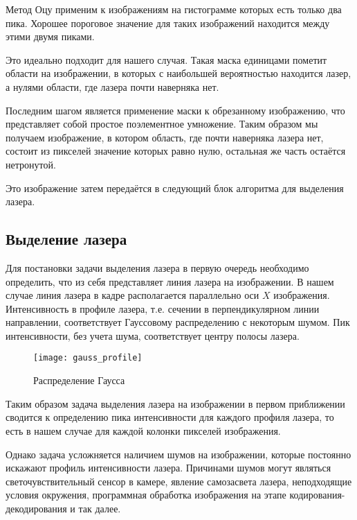             Метод Оцу применим к изображениям на гистограмме которых есть только два пика. Хорошее пороговое значение для таких изображений находится между этими двумя пиками\cite{opencvTHRESH}.
            
            Это идеально подходит для нашего случая. Такая маска единицами пометит области на изображении, в которых с наибольшей вероятностью находится лазер, а нулями области, где лазера почти наверняка нет.
            
            Последним шагом является применение маски к обрезанному изображению, что представляет собой простое поэлементное умножение. Таким образом мы получаем изображение, в котором область, где почти наверняка лазера нет, состоит из пикселей значение которых равно нулю, остальная же часть остаётся нетронутой.

            Это изображение затем передаётся в следующий блок алгоритма для выделения лазера.

        \subsection{Выделение лазера}
            Для постановки задачи выделения лазера в первую очередь необходимо определить, что из себя представляет линия лазера на изображении. В нашем случае линия лазера в кадре располагается параллельно оси $ X $ изображения. Интенсивность в профиле лазера, т.е. сечении в перпендикулярном линии направлении, соответствует Гауссовому распределению\cite{Qi2013, Molder2014} с некоторым шумом. Пик интенсивности, без учета шума, соответствует центру полосы лазера.
            \begin{wrapfigure}{l}{0.4\linewidth}
                \centering
                \texttt{[image: gauss\_profile]}
                \caption{Распределение Гаусса}
                \label{pic:gauss_profile}
            \end{wrapfigure}
            Таким образом задача выделения лазера на изображении в первом приближении сводится к определению пика интенсивности для каждого профиля лазера, то есть в нашем случае для каждой колонки пикселей изображения.
            
            Однако задача усложняется наличием шумов на изображении, которые постоянно искажают профиль интенсивности лазера. Причинами шумов могут являться светочувствительный сенсор в камере, явление самозасвета лазера, неподходящие условия окружения, программная обработка изображения на этапе кодирования-декодирования и так далее.
            
